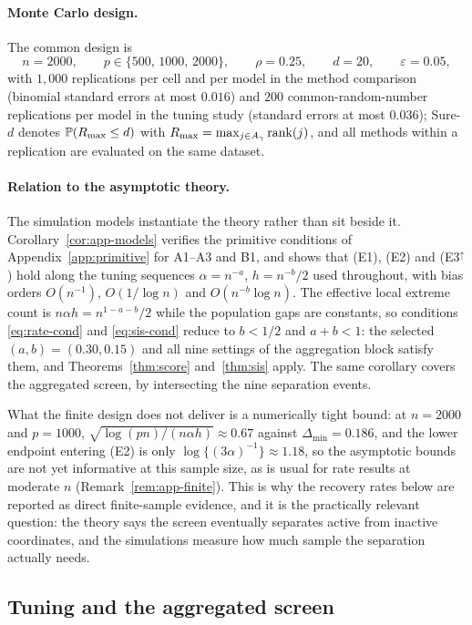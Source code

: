\paragraph{Monte Carlo design.}
The common design is
\[
 n=2000,\qquad p\in\{500,\,1000,\,2000\},\qquad \rho=0.25,
 \qquad d=20,\qquad \varepsilon=0.05,
\]
with $1{,}000$ replications per cell and per model in the method
comparison (binomial standard errors at most $0.016$) and $200$
common-random-number replications per model in the tuning study
(standard errors at most $0.036$); Sure-$d$ denotes
$\mathbb P(R_{\max}\le d)$ with $R_{\max}=\max_{j\in A_\gamma}\mathrm{rank}(j)$,
and all methods within a replication are evaluated on the same dataset.

\paragraph{Relation to the asymptotic theory.}
The simulation models instantiate the theory rather than sit beside it.
Corollary~\ref{cor:app-models} verifies the primitive conditions of
Appendix~\ref{app:primitive} for A1--A3 and B1, and shows that (E1),
(E2) and (E3$^\uparrow$) hold along the tuning sequences
$\alpha=n^{-a}$, $h=n^{-b}/2$ used throughout, with bias orders
$O(n^{-1})$, $O(1/\log n)$ and $O(n^{-b}\log n)$. The effective local
extreme count is $n\alpha h=n^{1-a-b}/2$ while the population gaps are
constants, so conditions \eqref{eq:rate-cond} and \eqref{eq:sis-cond}
reduce to $b<1/2$ and $a+b<1$: the selected $(a,b)=(0.30,0.15)$ and all
nine settings of the aggregation block satisfy them, and
Theorems~\ref{thm:score} and~\ref{thm:sis} apply. The same corollary
covers the aggregated screen, by intersecting the nine separation
events.

What the finite design does not deliver is a numerically tight bound:
at $n=2000$ and $p=1000$, $\sqrt{\log(pn)/(n\alpha h)}\approx0.67$
against $\Delta_{\min}=0.186$, and the lower endpoint entering (E2) is
only $\log\{(3\alpha)^{-1}\}\approx1.18$, so the asymptotic bounds are
not yet informative at this sample size, as is usual for rate results at
moderate $n$ (Remark~\ref{rem:app-finite}). This is why the recovery rates below are reported as
direct finite-sample evidence, and it is the practically relevant
question: the theory says the screen eventually separates active from
inactive coordinates, and the simulations measure how much sample the
separation actually needs.

\subsection{Tuning and the aggregated screen}\label{sec:tuning}


